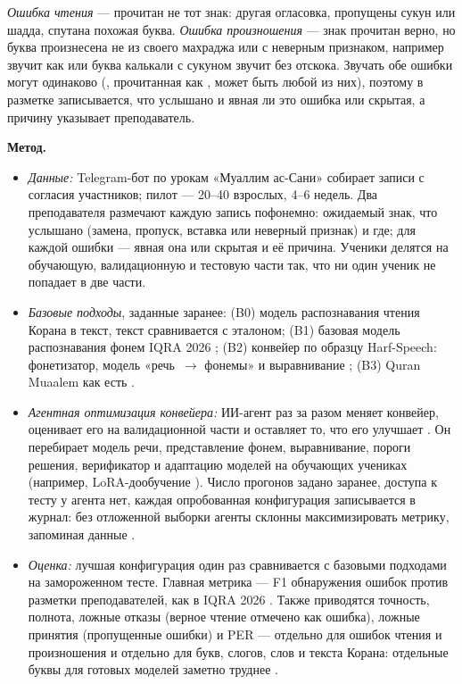\documentclass[a4paper,14pt]{extarticle}
\begin{document}
\emph{Ошибка чтения} --- прочитан не тот знак: другая огласовка, пропущены сукун или шадда, спутана
похожая буква. \emph{Ошибка произношения} --- знак прочитан верно, но буква произнесена не из своего
махраджа \cite{SRC-059} или с неверным признаком, например  звучит как  или буква калькали с
сукуном звучит без отскока. Звучать обе ошибки могут одинаково (, прочитанная как , может быть
любой из них), поэтому в разметке записывается, что услышано и явная ли это ошибка или скрытая, а причину
указывает преподаватель.

\textbf{Метод.}
\begin{itemize}
  \item \emph{Данные:} Telegram-бот по урокам «Муаллим ас-Сани» собирает записи с согласия участников;
    пилот --- 20--40 взрослых, 4--6 недель. Два преподавателя размечают каждую запись пофонемно: ожидаемый
    знак, что услышано (замена, пропуск, вставка или неверный признак) и где; для каждой ошибки --- явная
    она или скрытая и её причина. Ученики делятся на обучающую,
    валидационную и тестовую части так, что ни один ученик не попадает в две части.
  \item \emph{Базовые подходы}, заданные заранее: (B0) модель распознавания чтения Корана в текст, текст
    сравнивается с эталоном; (B1) базовая модель распознавания фонем IQRA 2026 \cite{SRC-031,SRC-066};
    (B2) конвейер по образцу Harf-Speech: фонетизатор, модель «речь~$\to$ фонемы» и выравнивание
    \cite{SRC-149}; (B3) Quran Muaalem как есть \cite{SRC-002}.
  \item \emph{Агентная оптимизация конвейера:} ИИ-агент раз за разом меняет конвейер, оценивает его на
    валидационной части и оставляет то, что его улучшает \cite{SRC-067}. Он перебирает модель речи,
    представление фонем, выравнивание, пороги решения, верификатор и адаптацию моделей на обучающих
    учениках (например, LoRA-дообучение \cite{SRC-111}). Число прогонов задано заранее, доступа к тесту у
    агента нет, каждая опробованная конфигурация записывается в журнал: без отложенной выборки агенты
    склонны максимизировать метрику, запоминая данные \cite{SRC-067}.
  \item \emph{Оценка:} лучшая конфигурация один раз сравнивается с базовыми подходами на замороженном тесте.
    Главная метрика --- F1 обнаружения ошибок против разметки преподавателей, как в IQRA 2026
    \cite{SRC-031}. Также приводятся точность, полнота, ложные отказы (верное чтение отмечено как ошибка),
    ложные принятия (пропущенные ошибки) и PER --- отдельно для ошибок чтения и произношения и отдельно для
    букв, слогов, слов и текста Корана: отдельные буквы для готовых моделей заметно труднее \cite{SRC-151}.
\end{itemize}
\end{document}
